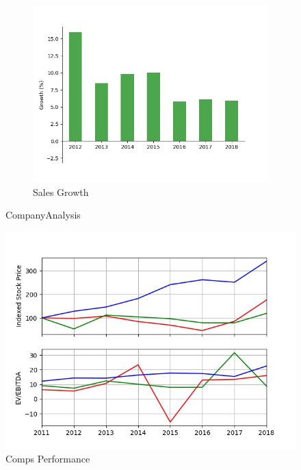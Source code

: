 \documentclass{article}
\newcommand{\company}{Company}
\begin{document}
\begin{figure}[!h]
\begin{subfigure}[b]{0.4\linewidth}
		\includegraphics[width=\linewidth]{charts/sales_growth.jpg}
		\caption{Sales Growth}
	\end{subfigure}
	\caption{\company Analysis}
\end{figure}

\begin{figure}[!h]

\includegraphics[width=\linewidth]{charts/comps_graph.jpg}
\caption{Comps Performance}

\end{figure}
\end{document}
